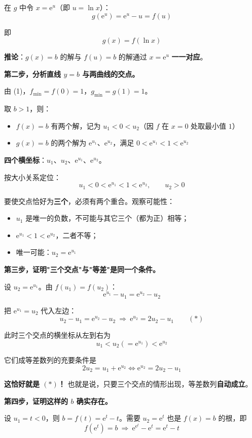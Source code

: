 在 $g$ 中令 $x=\mathrm e^{u}$（即 $u=\ln x$）：
\[g\left(\mathrm e^{u}\right)=\mathrm e^{u}-u=f(u)\]

即
\[\boxed{g(x)=f(\ln x)}\]

\textbf{推论}：$g(x)=b$ 的解与 $f(u)=b$ 的解通过 $x=\mathrm e^{u}$ \textbf{一一对应}。

\textbf{第二步，分析直线 $y=b$ 与两曲线的交点。}

由 (1)，$f_{\min}=f(0)=1$，$g_{\min}=g(1)=1$。

取 $b>1$，则：
\begin{itemize}
\item $f(x)=b$ 有两个解，记为 $u_1<0<u_2$（因 $f$ 在 $x=0$ 处取最小值 $1$）
\item $g(x)=b$ 的两个解为 $\mathrm e^{u_1}$、$\mathrm e^{u_2}$，满足 $0<\mathrm e^{u_1}<1<\mathrm e^{u_2}$
\end{itemize}

\textbf{四个横坐标}：$u_1$、$u_2$、$\mathrm e^{u_1}$、$\mathrm e^{u_2}$。

按大小关系定位：
\[u_1<0<\mathrm e^{u_1}<1<\mathrm e^{u_2},\qquad u_2>0\]

要使交点恰好为\textbf{三个}，必须有两个重合。观察可能性：
\begin{itemize}
\item $u_1$ 是唯一的负数，不可能与其它三个（都为正）相等；
\item $\mathrm e^{u_1}<1<\mathrm e^{u_2}$，二者不等；
\item 唯一可能：$u_2=\mathrm e^{u_1}$
\end{itemize}

\textbf{第三步，证明"三个交点"与"等差"是同一个条件。}

设 $u_2=\mathrm e^{u_1}$。由 $f\left(u_1\right)=f\left(u_2\right)$：
\[\mathrm e^{u_1}-u_1=\mathrm e^{u_2}-u_2\]

把 $\mathrm e^{u_1}=u_2$ 代入左边：
\[u_2-u_1=\mathrm e^{u_2}-u_2\ \Longrightarrow\ \mathrm e^{u_2}=2u_2-u_1\qquad(\ast)\]

此时三个交点的横坐标从左到右为
\[u_1<u_2\left(=\mathrm e^{u_1}\right)<\mathrm e^{u_2}\]

它们成等差数列的充要条件是
\[2u_2=u_1+\mathrm e^{u_2}\iff \mathrm e^{u_2}=2u_2-u_1\]

\textbf{这恰好就是 $(\ast)$！} 也就是说，只要三个交点的情形出现，等差数列\textbf{自动成立}。

\textbf{第四步，证明这样的 $b$ 确实存在。}

设 $u_1=t<0$，则 $b=f(t)=\mathrm e^{t}-t$。需要 $u_2=\mathrm e^{t}$ 也是 $f(x)=b$ 的根，即
\[f\left(\mathrm e^{t}\right)=b\ \Longrightarrow\ \mathrm e^{\mathrm e^{t}}-\mathrm e^{t}=\mathrm e^{t}-t\]

